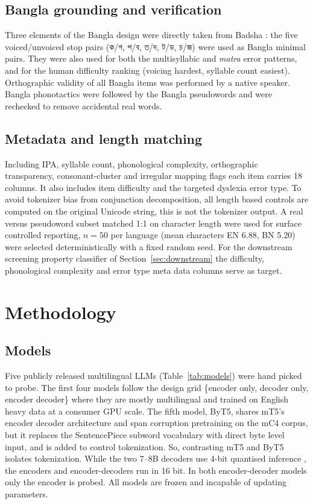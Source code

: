 \documentclass[preprint,12pt,authoryear]{elsarticle}
\newcommand{\bn}[1]{{\banglafont #1}}
\begin{document}
\subsection{Bangla grounding and verification}
Three elements of the Bangla design were directly taken from Badsha \citeyearpar{badsha2024mall}: the five voiced/unvoiced stop pairs (\bn{ক/গ}, \bn{প/ব}, \bn{ত/দ}, \bn{ট/ড}, \bn{চ/জ}) were used as Bangla minimal pairs. They were also used for both the multisyllabic and \textit{matra} error patterns, and for the human difficulty ranking (voicing hardest, syllable count easiest). Orthographic validity of all Bangla items was performed by a native speaker. Bangla phonotactics were followed by the Bangla pseudowords and were rechecked to remove accidental real words.

\subsection{Metadata and length matching}
Including IPA, syllable count, phonological complexity, orthographic transparency, consonant-cluster and irregular mapping flags each item carries 18 columns. It also includes item difficulty and the targeted dyslexia error type. To avoid tokenizer bias from conjunction decomposition, all length based controls are computed on the original Unicode string, this is not the tokenizer output. A real versus pseudoword subset matched 1:1 on character length were used for surface controlled reporting, $n=50$ per language (mean characters EN 6.88, BN 5.20) were selected deterministically with a fixed random seed. For the downstream screening property classifier of Section~\ref{sec:downstream} the difficulty, phonological complexity and error type meta data columns serve as target.

\section{Methodology}
\label{sec:method}

\subsection{Models}
Five publicly released multilingual LLMs (Table~\ref{tab:models}) were hand picked to probe. The first four models follow the design grid \{encoder only, decoder only, encoder decoder\} where they are mostly multilingual and trained on English heavy data at a consumer GPU scale. The fifth model, ByT5, shares mT5's encoder decoder architecture and span corruption pretraining on the mC4 corpus, but it replaces the SentencePiece subword vocabulary with direct byte level input, and is added to control tokenization. So, contrasting mT5 and ByT5 isolates tokenization. While the two 7--8B decoders use 4-bit quantised inference \citep{dettmers2022bnb,dettmers2023qlora}, the encoders and encoder-decoders run in 16 bit. In both encoder-decoder models only the encoder is probed. All models are frozen and incapable of updating parameters.
\end{document}
